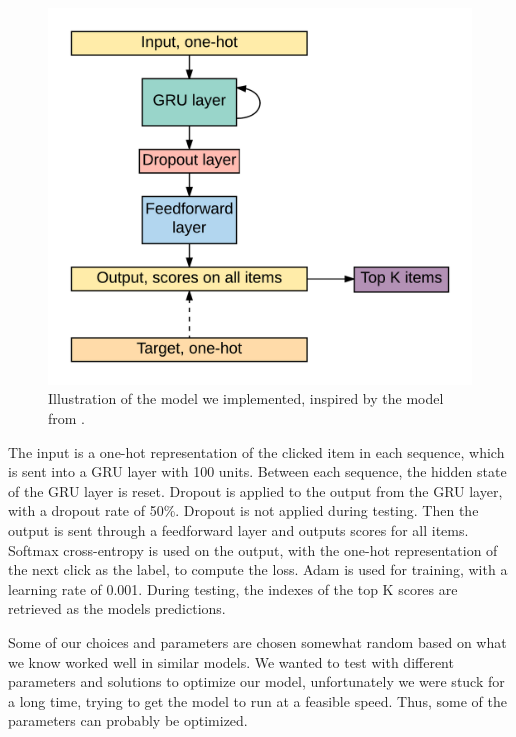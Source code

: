 \begin{figure}[htp]
	\centering
	\includegraphics[width=1.0\textwidth]{fig/skrede-rnn.png}
	\caption{Illustration of the model we implemented, inspired by the model from \cite{DBLP:journals/corr/HidasiKBT15}.}
	\label{fig:skrede-rnn}
\end{figure}

The input is a one-hot representation of the clicked item in each sequence, which is sent into a GRU layer with 100 units. Between each sequence, the hidden state of the GRU layer is reset. Dropout is applied to the output from the GRU layer, with a dropout rate of 50\%. Dropout is not applied during testing. Then the output is sent through a feedforward layer and outputs scores for all items. Softmax cross-entropy is used on the output, with the one-hot representation of the next click as the label, to compute the loss. Adam \cite{DBLP:journals/corr/KingmaB14} is used for training, with a learning rate of 0.001. During testing, the indexes of the top K scores are retrieved as the models predictions.

Some of our choices and parameters are chosen somewhat random based on what we know worked well in similar models. We wanted to test with different parameters and solutions to optimize our model, unfortunately we were stuck for a long time, trying to get the model to run at a feasible speed. Thus, some of the parameters can probably be optimized.

